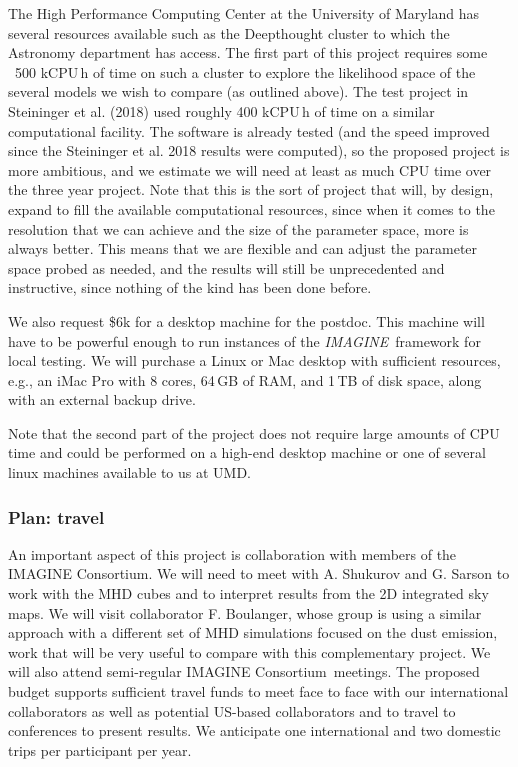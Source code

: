 \documentclass[12pt]{article}
\newcommand{\imagineC}{IMAGINE Consortium}
\newcommand{\imagineSW}{\textsl{IMAGINE}}
\begin{document}
The High Performance Computing Center at the University of Maryland has several resources available such as the Deepthought cluster to which the Astronomy department has access.  The first part of this project requires some ~500 kCPU\,h of time on such a cluster to explore the likelihood space of the several models we wish to compare (as outlined above).  The test project in Steininger et al. (2018) used roughly 400 kCPU\,h of time on a similar computational facility. The software is already tested (and the speed improved since the Steininger et al. 2018 results were computed), so the proposed project is more ambitious, and we estimate we will need at least as much CPU time over the three year project. Note that this is the sort of project that will, by design, expand to fill the available computational resources, since when it comes to the resolution that we can achieve and the size of the parameter space, more is always better. This means that we are flexible and can adjust the parameter space probed as needed, and the results will still be unprecedented and instructive, since nothing of the kind has been done before.

We also request \$6k for a desktop machine for the postdoc. This machine will have to be powerful enough to run instances of the \imagineSW\ framework for local testing.  We will purchase a Linux or Mac desktop with sufficient resources, e.g., an iMac Pro with 8 cores, 64\,GB of RAM, and 1\,TB of disk space, along with an external backup drive.

Note that the second part of the project does not require large amounts of CPU time and could be performed on a high-end desktop machine or one of several linux machines available to us at UMD.  



\subsubsection*{Plan:  travel}

An important aspect of this project is collaboration with members of the \imagineC.  We will need to meet with A. Shukurov and G. Sarson to work with the MHD cubes and to interpret results from the 2D integrated sky maps. We will visit collaborator F. Boulanger, whose group is using a similar approach with a different set of MHD simulations focused on the dust emission, work that will be very useful to compare with this complementary project.  We will also attend semi-regular \imagineC\ meetings.  The proposed budget supports sufficient travel funds to meet face to face with our international collaborators as well as potential US-based collaborators and to travel to conferences to present results.  We anticipate one international and two domestic trips per participant per year.
\end{document}

